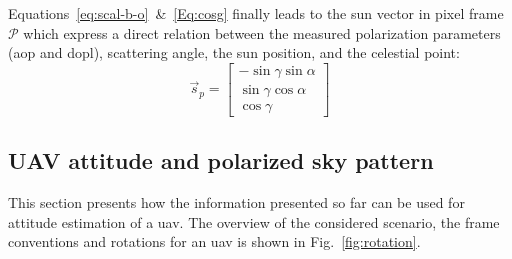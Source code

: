 Equations~\ref{eq:scal-b-o}~\&~\ref{Eq:cosg} finally leads to the sun vector
in pixel frame $\mathcal{P}$ which express a direct relation between the
measured polarization parameters (\gls{aop} and \gls{dopl}),
scattering angle, the sun position,  and the celestial point:
\begin{equation}
  \label{eq:sunp}
  \vec{s}_{p} =
    \begin{bmatrix}
    -\sin\gamma \sin\alpha\\
    \sin\gamma \cos\alpha\\
    \cos\gamma
  \end{bmatrix}
\end{equation}

\subsection{UAV attitude and polarized sky pattern}
\label{subsec:ps-attitude}
This section presents how the information presented so far can be used for
attitude estimation of a \gls{uav}.
The overview of the considered scenario, the frame conventions and rotations
for an \gls{uav} is shown in Fig.~\ref{fig:rotation}.

